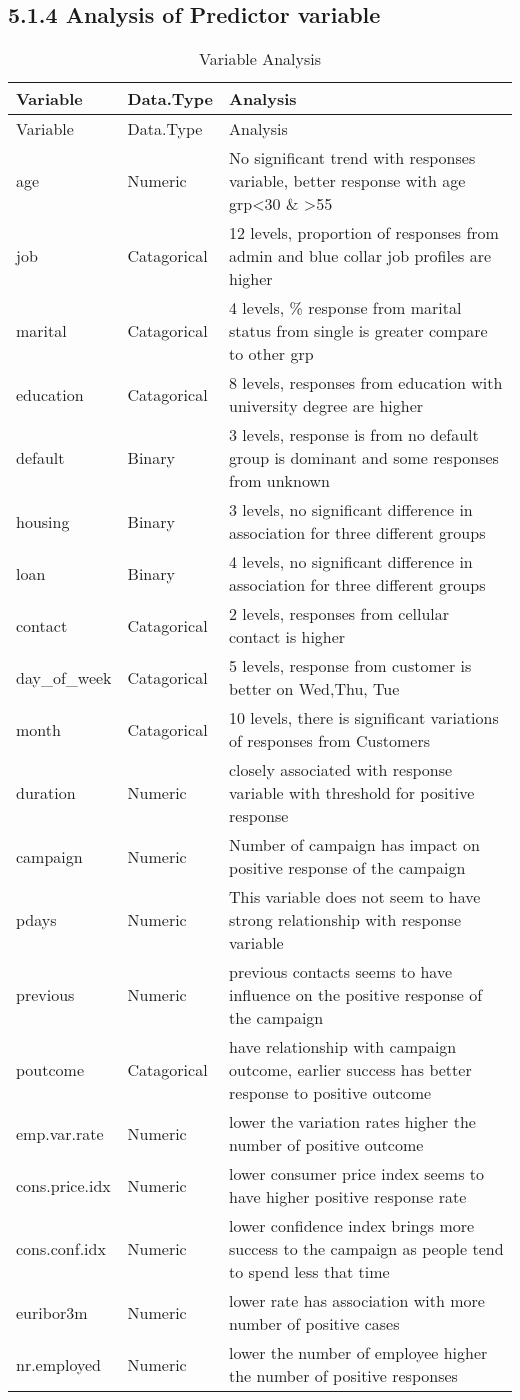 \documentclass[english,floatsintext,man]{apa6}
\begin{document}
\subsection{5.1.4 Analysis of Predictor
variable}\label{analysis-of-predictor-variable}

\begin{longtable}[c]{@{}lll@{}}
\caption{Variable Analysis}\tabularnewline
\toprule
Variable & Data.Type & Analysis\tabularnewline
\midrule
\endfirsthead
\toprule
Variable & Data.Type & Analysis\tabularnewline
\midrule
\endhead
age & Numeric & No significant trend with responses variable, better
response with age grp\textless{}30 \& \textgreater{}55\tabularnewline
job & Catagorical & 12 levels, proportion of responses from admin and
blue collar job profiles are higher\tabularnewline
marital & Catagorical & 4 levels, \% response from marital status from
single is greater compare to other grp\tabularnewline
education & Catagorical & 8 levels, responses from education with
university degree are higher\tabularnewline
default & Binary & 3 levels, response is from no default group is
dominant and some responses from unknown\tabularnewline
housing & Binary & 3 levels, no significant difference in association
for three different groups\tabularnewline
loan & Binary & 4 levels, no significant difference in association for
three different groups\tabularnewline
contact & Catagorical & 2 levels, responses from cellular contact is
higher\tabularnewline
day\_of\_week & Catagorical & 5 levels, response from customer is better
on Wed,Thu, Tue\tabularnewline
month & Catagorical & 10 levels, there is significant variations of
responses from Customers\tabularnewline
duration & Numeric & closely associated with response variable with
threshold for positive response\tabularnewline
campaign & Numeric & Number of campaign has impact on positive response
of the campaign\tabularnewline
pdays & Numeric & This variable does not seem to have strong
relationship with response variable\tabularnewline
previous & Numeric & previous contacts seems to have influence on the
positive response of the campaign\tabularnewline
poutcome & Catagorical & have relationship with campaign outcome,
earlier success has better response to positive outcome\tabularnewline
emp.var.rate & Numeric & lower the variation rates higher the number of
positive outcome\tabularnewline
cons.price.idx & Numeric & lower consumer price index seems to have
higher positive response rate\tabularnewline
cons.conf.idx & Numeric & lower confidence index brings more success to
the campaign as people tend to spend less that time\tabularnewline
euribor3m & Numeric & lower rate has association with more number of
positive cases\tabularnewline
nr.employed & Numeric & lower the number of employee higher the number
of positive responses\tabularnewline
\bottomrule
\end{longtable}
\end{document}
